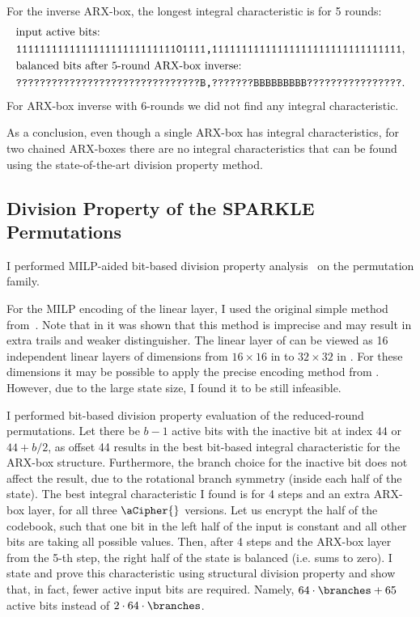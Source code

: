 For the inverse ARX-box, the longest integral characteristic is for 5 rounds:
\begin{align*}
& \text{input active bits:}\\
& \text{\texttt{11111111111111111111111111101111,11111111111111111111111111111111}},\\
& \text{balanced bits after 5-round ARX-box inverse:}\\
& \text{\texttt{???????????????????????????????B,???????BBBBBBBBB????????????????}}.
\end{align*}
For ARX-box inverse with 6-rounds we did not find any integral characteristic. 

As a conclusion, even though a single ARX-box has integral characteristics, for two chained ARX-boxes there are no integral characteristics that can be found using the state-of-the-art division property method.


\subsection{Division Property of the SPARKLE Permutations}

I performed MILP-aided bit-based division property analysis~\cite{division,divisionmilp} on the \aCipher{} permutation family.

For the MILP encoding of the linear layer, I used the original simple method from~\cite{divisionmilp}. Note that in \cite{divisionlinear} it was shown that this method is imprecise and may result in extra trails and weaker distinguisher. The linear layer of \aCipher{} can be viewed as 16 independent linear layers of dimensions from $16 \times 16$ in \aCipherSmall{} to $32 \times 32$ in \aCipherLarge{}. For these dimensions it may be possible to apply the precise encoding method from \cite{divisionlinear}. However, due to the large state size, I found it to be still infeasible.

I performed bit-based division property evaluation of the reduced-round \aCipher{} permutations. Let there be $b-1$ active bits with the inactive bit at index $44$ or $44+b/2$, as offset 44 results in the best bit-based integral characteristic for the ARX-box structure. Furthermore, the branch choice for the inactive bit does not affect the result, due to the rotational branch symmetry (inside each half of the state). The best integral characteristic I found is for 4 steps and an extra ARX-box layer, for all three $\aCipher{}$ versions. Let us encrypt the half of the codebook, such that one bit in the left half of the input is constant and all other bits are taking all possible values. Then, after 4 steps and the ARX-box layer from the 5-th step, the right half of the state is balanced (i.e. sums to zero). I state and prove this characteristic using structural division property and show that, in fact, fewer active input bits are required. Namely, $64\cdot\branches+65$ active bits instead of $2\cdot64\cdot \branches$.

